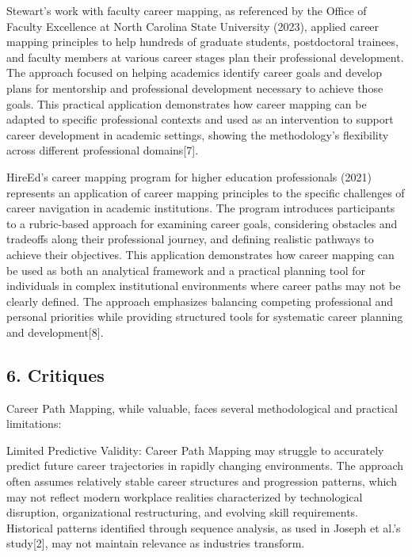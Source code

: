 \documentclass[
  letterpaper,
  DIV=11,
  numbers=noendperiod]{scrartcl}
\begin{document}
Stewart's work with faculty career mapping, as referenced by the Office
of Faculty Excellence at North Carolina State University (2023), applied
career mapping principles to help hundreds of graduate students,
postdoctoral trainees, and faculty members at various career stages plan
their professional development. The approach focused on helping
academics identify career goals and develop plans for mentorship and
professional development necessary to achieve those goals. This
practical application demonstrates how career mapping can be adapted to
specific professional contexts and used as an intervention to support
career development in academic settings, showing the methodology's
flexibility across different professional domains{[}7{]}.

HireEd's career mapping program for higher education professionals
(2021) represents an application of career mapping principles to the
specific challenges of career navigation in academic institutions. The
program introduces participants to a rubric-based approach for examining
career goals, considering obstacles and tradeoffs along their
professional journey, and defining realistic pathways to achieve their
objectives. This application demonstrates how career mapping can be used
as both an analytical framework and a practical planning tool for
individuals in complex institutional environments where career paths may
not be clearly defined. The approach emphasizes balancing competing
professional and personal priorities while providing structured tools
for systematic career planning and development{[}8{]}.

\subsection{6. Critiques}\label{critiques}

Career Path Mapping, while valuable, faces several methodological and
practical limitations:

Limited Predictive Validity: Career Path Mapping may struggle to
accurately predict future career trajectories in rapidly changing
environments. The approach often assumes relatively stable career
structures and progression patterns, which may not reflect modern
workplace realities characterized by technological disruption,
organizational restructuring, and evolving skill requirements.
Historical patterns identified through sequence analysis, as used in
Joseph et al.'s study{[}2{]}, may not maintain relevance as industries
transform.
\end{document}
